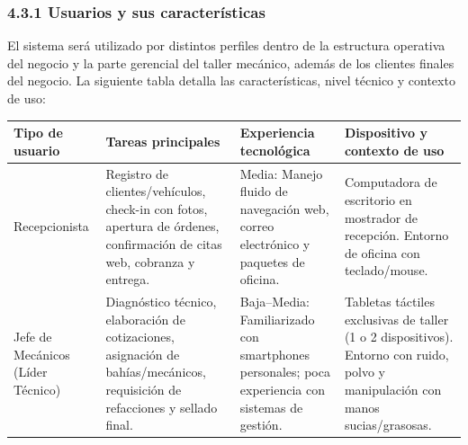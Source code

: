 \subsubsection{4.3.1 Usuarios y sus
características}\label{usuarios-y-sus-caracteruxedsticas}

El sistema será utilizado por distintos perfiles dentro de la estructura
operativa del negocio y la parte gerencial del taller mecánico, además
de los clientes finales del negocio. La siguiente tabla detalla las
características, nivel técnico y contexto de uso:

{\def\LTcaptype{none} %
\begin{longtable}[]{@{}
  >{\raggedright\arraybackslash}p{}
  >{\raggedright\arraybackslash}p{}
  >{\raggedright\arraybackslash}p{}
  >{\raggedright\arraybackslash}p{}@{}}
\toprule\noalign{}
\begin{minipage}[b]{\linewidth}\raggedright
\textbf{Tipo de usuario}
\end{minipage} & \begin{minipage}[b]{\linewidth}\raggedright
\textbf{Tareas principales}
\end{minipage} & \begin{minipage}[b]{\linewidth}\raggedright
\textbf{Experiencia tecnológica}
\end{minipage} & \begin{minipage}[b]{\linewidth}\raggedright
\textbf{Dispositivo y contexto de uso}
\end{minipage} \\
\midrule\noalign{}
\endhead
\bottomrule\noalign{}
\endlastfoot
Recepcionista & Registro de clientes/vehículos, check-in con fotos,
apertura de órdenes, confirmación de citas web, cobranza y entrega. &
Media: Manejo fluido de navegación web, correo electrónico y paquetes de
oficina. & Computadora de escritorio en mostrador de recepción. Entorno
de oficina con teclado/mouse. \\
Jefe de Mecánicos (Líder Técnico) & Diagnóstico técnico, elaboración de
cotizaciones, asignación de bahías/mecánicos, requisición de refacciones
y sellado final. & Baja--Media: Familiarizado con smartphones
personales; poca experiencia con sistemas de gestión. & Tabletas
táctiles exclusivas de taller (1 o 2 dispositivos). Entorno con ruido,
polvo y manipulación con manos sucias/grasosas. \\

\end{longtable}}
